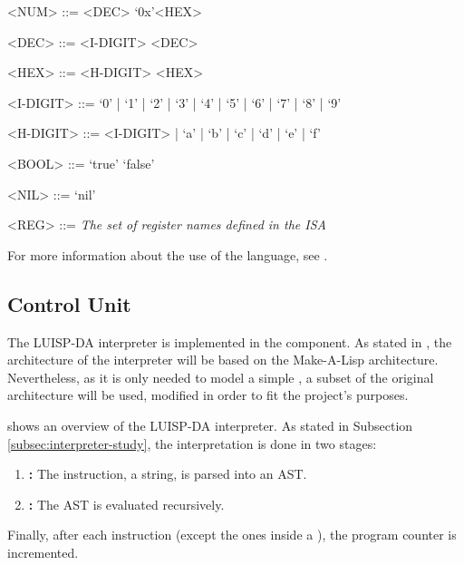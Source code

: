 \begin{tcolorbox}[enhanced jigsaw,breakable,top=4mm]
\begin{grammar}
    <NUM> ::= <DEC>
      \alt `0x'<HEX>

    <DEC> ::= <I-DIGIT>
      <DEC>

    <HEX> ::= <H-DIGIT>
      <HEX>

    <I-DIGIT> ::= `0' | `1' | `2' | `3' | `4' | `5' | `6' | `7' | `8' | `9'

    <H-DIGIT> ::= <I-DIGIT> | `a' | `b' | `c' | `d' | `e' | `f'

    <BOOL> ::= `true'
      \alt `false'

    <NIL> ::= `nil'

    <REG> ::= \textit{The set of \gls{register} names defined in the \gls{ISA}}
  \end{grammar}
\end{tcolorbox}

\noindent
For more information about the use of the language, see .


\subsection{Control Unit}\label{subsec:interpreter-design}
The LUISP-DA \gls{interpreter} is implemented in the  component. As stated in , the architecture of the \gls{interpreter} will be based on the Make-A-Lisp \parencite{mal} architecture. Nevertheless, as it is only needed to model a simple , a subset of the original architecture will be used, modified in order to fit the project's purposes.

 shows an overview of the LUISP-DA interpreter. As stated in Subsection \ref{subsec:interpreter-study}, the interpretation is done in two stages:
\begin{enumerate}
  \item \textbf{:} The instruction, a string, is parsed into an \gls{AST}.
  \item \textbf{:} The \gls{AST} is evaluated recursively.
\end{enumerate}

Finally, after each instruction (except the ones inside a ), the \gls{program counter} is incremented.


